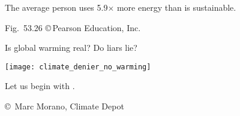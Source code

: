 \documentclass[t]{beamer}
\begin{document}
{
\begin{frame}[b]{The average person uses 5.9$\times$ more energy than is sustainable.}

	\hfill \tiny Fig.~53.26 \copyright\,Pearson Education, Inc.
\end{frame}
}

%
\begin{frame}[t]{Is global warming real? Do liars lie?}
	\begin{center}
		\texttt{[image: climate\_denier\_no\_warming]}
	\end{center}

	Let us begin with .
	
	\vfilll
	
	\hfill \tiny \copyright~Marc Morano, Climate Depot
\end{frame}

%
\end{document}
